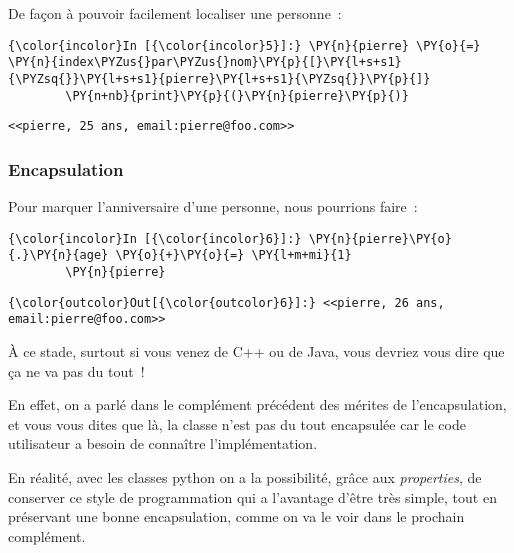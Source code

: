    De façon à pouvoir facilement localiser une personne~:

    \begin{Verbatim}[commandchars=\\\{\}]
{\color{incolor}In [{\color{incolor}5}]:} \PY{n}{pierre} \PY{o}{=} \PY{n}{index\PYZus{}par\PYZus{}nom}\PY{p}{[}\PY{l+s+s1}{\PYZsq{}}\PY{l+s+s1}{pierre}\PY{l+s+s1}{\PYZsq{}}\PY{p}{]}
        \PY{n+nb}{print}\PY{p}{(}\PY{n}{pierre}\PY{p}{)}
\end{Verbatim}


    \begin{Verbatim}[commandchars=\\\{\}]
<<pierre, 25 ans, email:pierre@foo.com>>

    \end{Verbatim}

    \hypertarget{encapsulation}{%
\subsubsection{Encapsulation}\label{encapsulation}}

    Pour marquer l'anniversaire d'une personne, nous pourrions faire~:

    \begin{Verbatim}[commandchars=\\\{\}]
{\color{incolor}In [{\color{incolor}6}]:} \PY{n}{pierre}\PY{o}{.}\PY{n}{age} \PY{o}{+}\PY{o}{=} \PY{l+m+mi}{1}
        \PY{n}{pierre}
\end{Verbatim}


\begin{Verbatim}[commandchars=\\\{\}]
{\color{outcolor}Out[{\color{outcolor}6}]:} <<pierre, 26 ans, email:pierre@foo.com>>
\end{Verbatim}
            
    À ce stade, surtout si vous venez de C++ ou de Java, vous devriez vous
dire que ça ne va pas du tout~!

En effet, on a parlé dans le complément précédent des mérites de
l'encapsulation, et vous vous dites que là, la classe n'est pas du tout
encapsulée car le code utilisateur a besoin de connaître
l'implémentation.

    En réalité, avec les classes python on a la possibilité, grâce aux
\emph{properties}, de conserver ce style de programmation qui a
l'avantage d'être très simple, tout en préservant une bonne
encapsulation, comme on va le voir dans le prochain complément.

